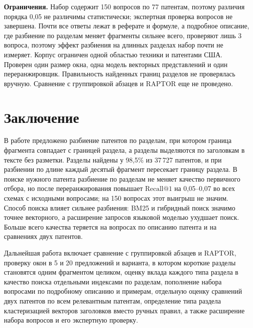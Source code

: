 \documentclass{article}
\makeatletter
\newcommand{\Rk}[1]{\mathrm{Recall@}#1}
\makeatother
\begin{document}
\textbf{Ограничения.} Набор содержит 150 вопросов по 77 патентам, поэтому различия порядка 0,05 не различимы статистически; экспертная проверка вопросов не завершена. Почти все ответы лежат в реферате и формуле, а подробное описание, где разбиение по разделам меняет фрагменты сильнее всего, проверяют лишь 3 вопроса, поэтому эффект разбиения на длинных разделах набор почти не измеряет. Корпус ограничен одной областью техники и патентами США. Проверен один размер окна, одна модель векторных представлений и один переранжировщик. Правильность найденных границ разделов не проверялась вручную. Сравнение с группировкой абзацев и RAPTOR еще не проведено.

\section{Заключение}\label{sec:concl}

В работе предложено разбиение патентов по разделам, при котором граница фрагмента совпадает с границей раздела, а разделы выделяются по заголовкам в тексте без разметки. Разделы найдены у 98,5\% из 37\,727 патентов, и при разбиении по длине каждый десятый фрагмент пересекает границу раздела. В поиске нужного патента разбиение по разделам не меняет качество первичного отбора, но после переранжирования повышает $\Rk{1}$ на 0,05--0,07 во всех схемах с исходными вопросами; на 150 вопросах этот выигрыш не значим. Способ поиска влияет сильнее разбиения: BM25 и гибридный поиск значимо точнее векторного, а расширение запросов языковой моделью ухудшает поиск. Больше всего качества теряется на вопросах по описанию патента и на сравнениях двух патентов.

Дальнейшая работа включает сравнение с группировкой абзацев и RAPTOR, проверку окон в 5 и 20 предложений и варианта, в котором короткие разделы становятся одним фрагментом целиком, оценку вклада каждого типа раздела в качество поиска отдельными индексами по разделам, пополнение набора вопросами по подробному описанию и примерам, отдельную оценку сравнений двух патентов по всем релевантным патентам, определение типа раздела кластеризацией векторов заголовков вместо ручных правил, а также расширение набора вопросов и его экспертную проверку.




\end{document}
